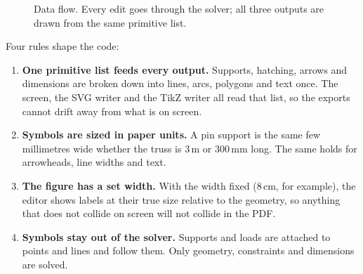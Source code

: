 \documentclass[10pt,a4paper]{article}
\newcommand{\code}[1]{\texttt{#1}}
\begin{document}
\begin{figure}[h]
\centering
{}
\caption{Data flow. Every edit goes through the solver; all three outputs
are drawn from the same primitive list.}
\end{figure}

Four rules shape the code:

\begin{enumerate}
\item \textbf{One primitive list feeds every output.} Supports, hatching,
arrows and dimensions are broken down into lines, arcs, polygons and text
once. The screen, the SVG writer and the TikZ writer all read that list, so
the exports cannot drift away from what is on screen.
\item \textbf{Symbols are sized in paper units.} A pin support is the same
few millimetres wide whether the truss is 3\,m or 300\,mm long. The same
holds for arrowheads, line widths and text.
\item \textbf{The figure has a set width.} With the width fixed (8\,cm, for
example), the editor shows labels at their true size relative to the
geometry, so anything that does not collide on screen will not collide in
the PDF.
\item \textbf{Symbols stay out of the solver.} Supports and loads are
attached to points and lines and follow them. Only geometry, constraints
and dimensions are solved.
\end{enumerate}
\end{document}
